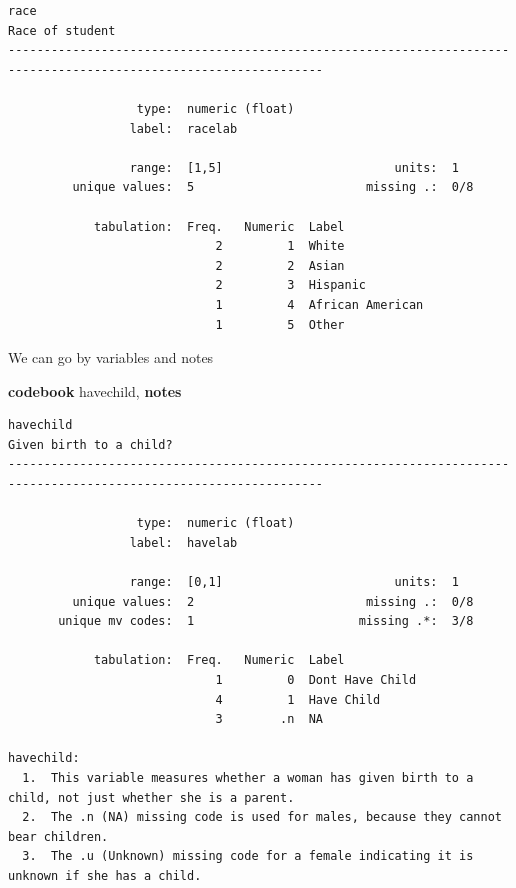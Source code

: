 \documentclass[
]{book}
\newenvironment{Shaded}{\begin{snugshade}}{\end{snugshade}}
\newcommand{\KeywordTok}[1]{\textcolor[rgb]{0.13,0.29,0.53}{\textbf{#1}}}
\newcommand{\NormalTok}[1]{#1}
\begin{document}
\begin{verbatim}
race                                                                                               Race of student
------------------------------------------------------------------------------------------------------------------

                  type:  numeric (float)
                 label:  racelab

                 range:  [1,5]                        units:  1
         unique values:  5                        missing .:  0/8

            tabulation:  Freq.   Numeric  Label
                             2         1  White
                             2         2  Asian
                             2         3  Hispanic
                             1         4  African American
                             1         5  Other
\end{verbatim}

We can go by variables and notes

\begin{Shaded}
\begin{Highlighting}[]
\KeywordTok{codebook}\NormalTok{ havechild, }\KeywordTok{notes}
\end{Highlighting}
\end{Shaded}

\begin{verbatim}
havechild                                                                                  Given birth to a child?
------------------------------------------------------------------------------------------------------------------

                  type:  numeric (float)
                 label:  havelab

                 range:  [0,1]                        units:  1
         unique values:  2                        missing .:  0/8
       unique mv codes:  1                       missing .*:  3/8

            tabulation:  Freq.   Numeric  Label
                             1         0  Dont Have Child
                             4         1  Have Child
                             3        .n  NA

havechild:
  1.  This variable measures whether a woman has given birth to a child, not just whether she is a parent.
  2.  The .n (NA) missing code is used for males, because they cannot bear children.
  3.  The .u (Unknown) missing code for a female indicating it is unknown if she has a child.
\end{verbatim}
\end{document}
